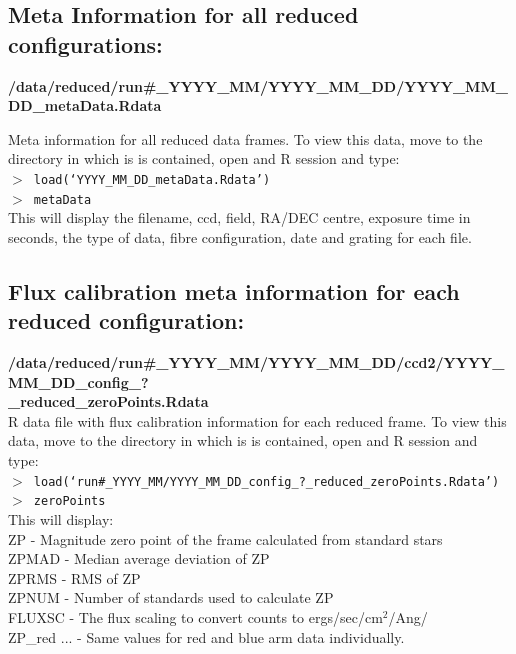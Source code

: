 \documentclass[12pt]{article}
\begin{document}
 

\subsection{Meta Information for all reduced configurations:} 
 
 \textbf{/data/reduced/run\#\_YYYY\_MM/YYYY\_MM\_DD/YYYY\_MM\_DD\_metaData.Rdata} 
 
 Meta information for all reduced data frames. To view this data, move to the directory in which is is contained, open and R session and type:\\
 

\hspace{10mm}  \texttt{$>$ load(`YYYY\_MM\_DD\_metaData.Rdata')}\\

\hspace{10mm}  \texttt{$>$ metaData}\\

 This will display the filename, ccd, field, RA/DEC centre, exposure time in seconds, the type of data, fibre configuration, date and grating for each file.  
  
 
 \subsection{Flux calibration meta information for each reduced configuration:} 
  
  \textbf{/data/reduced/run\#\_YYYY\_MM/YYYY\_MM\_DD/ccd2/YYYY\_MM\_DD\_config\_? \\ \_reduced\_zeroPoints.Rdata} \\
  
  R data file with flux calibration information for each reduced frame. To view this data, move to the directory in which is is contained, open and R session and type:\\
 

\hspace{10mm}  \texttt{$>$ load(`run\#\_YYYY\_MM/YYYY\_MM\_DD\_config\_?\_reduced\_zeroPoints.Rdata')}\\

\hspace{10mm}  \texttt{$>$ zeroPoints}\\

This will display:\\

ZP - Magnitude zero point of the frame calculated from standard stars     \\
ZPMAD - Median average deviation of ZP    \\
ZPRMS - RMS of ZP   \\
ZPNUM - Number of standards used to calculate ZP\\
FLUXSC - The flux scaling to convert counts to ergs/sec/cm$^2$/Ang/\\
ZP\_red ... - Same values for red and blue arm data individually.  \\
\end{document}
